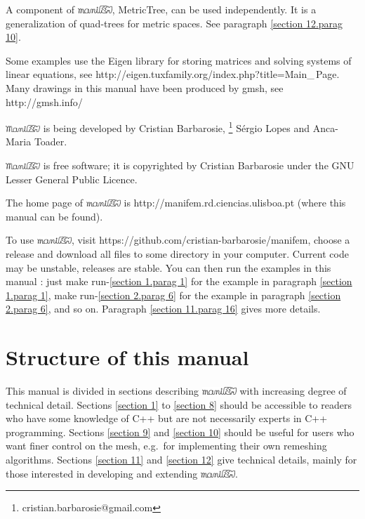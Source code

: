 \documentclass[a4paper,oneside]{scrbook}
\def\numb{}
\newcommand\ManiFEM{\leavevmode\hbox{\includegraphics[width=13mm]{manifem-large}}}
\newcommand\maniFEM{\leavevmode\hbox{\includegraphics[width=13mm]{manifem-small}}}
\renewcommand\tt{\normalfont\ttfamily}
\begin{document}
A component of \maniFEM, {\small\tt MetricTree}, can be used independently.
It is a generalization of quad-trees for metric spaces.
See paragraph \ref{\numb section 12.\numb parag 10}.

Some examples use the {\small\tt Eigen} library for  storing matrices and solving systems of
linear equations, see {\small\tt http://eigen.tuxfamily.org/index.php?title=Main\_\,Page}.
Many drawings in this manual have been produced by {\small\tt gmsh}, see
{\small\tt http://gmsh.info/}

{\ManiFEM} is being developed by Cristian Barbarosie,%
\footnote {\small\tt cristian.barbarosie@gmail.com}
S\'ergio Lopes and Anca-Maria Toader.

{\ManiFEM} is free software; it is copyrighted by Cristian Barbarosie
under the GNU Lesser General Public Licence.

The home page of {\maniFEM} is {\small\tt http://manifem.rd.ciencias.ulisboa.pt}
(where this manual can be found).

To use \maniFEM, visit {\small\tt https://github.com/cristian-barbarosie/manifem},
choose a release and download all files to some directory in your computer.
Current code may be unstable, releases are stable.
You can then run the examples in this manual :
just {\small\tt make run-\ref{\numb section 1.\numb parag 1}}
for the example in paragraph \ref{\numb section 1.\numb parag 1},
{\small\tt make run-\ref{\numb section 2.\numb parag 6}}
for the example in paragraph \ref{\numb section 2.\numb parag 6}, and so on.
Paragraph \ref{\numb section 11.\numb parag 16} gives more details.
\vfil\eject


\section*{Structure of this manual}

This manual is divided in sections describing {\maniFEM} with increasing degree of technical
detail.
Sections \ref{\numb section 1} to \ref{\numb section 8} should be accessible to readers
who have some knowledge of {\tt C++} but are not necessarily experts in {\tt C++} programming.
Sections \ref{\numb section 9} and \ref{\numb section 10} should be useful for users
who want finer control on the mesh, e.g.\ for implementing their own remeshing algorithms.
Sections \ref{\numb section 11} and \ref{\numb section 12} give technical details,
mainly for those interested in developing and extending \maniFEM.
\end{document}
